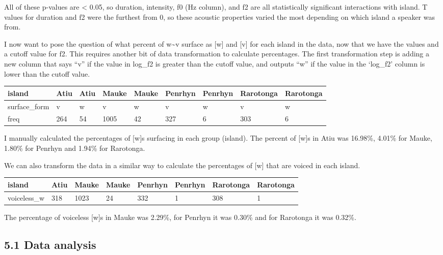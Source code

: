 \documentclass[
  ,man,floatsintext]{apa6}
\begin{document}
All of these p-values are \textless{} 0.05, so duration, intensity, f0 (Hz column), and f2 are all statistically significant interactions with island. T values for duration and f2 were the furthest from 0, so these acoustic properties varied the most depending on which island a speaker was from.

I now want to pose the question of what percent of w\textasciitilde v surface as {[}w{]} and {[}v{]} for each island in the data, now that we have the values and a cutoff value for f2. This requires another bit of data transformation to calculate percentages. The first transformation step is adding a new column that says ``v'' if the value in log\_f2 is greater than the cutoff value, and outputs ``w'' if the value in the `log\_f2' column is lower than the cutoff value.

\begin{tabular}{l|l|l|l|l|l|l|l|l}
\hline
island & Atiu & Atiu & Mauke & Mauke & Penrhyn & Penrhyn & Rarotonga & Rarotonga\\
\hline
surface\_form & v & w & v & w & v & w & v & w\\
\hline
freq & 264 & 54 & 1005 & 42 & 327 & 6 & 303 & 6\\
\hline
\end{tabular}

I manually calculated the percentages of {[}w{]}s surfacing in each group (island). The percent of {[}w{]}s in Atiu was 16.98\%, 4.01\% for Mauke, 1.80\% for Penrhyn and 1.94\% for Rarotonga.

We can also transform the data in a similar way to calculate the percentages of {[}w{]} that are voiced in each island.

\begin{tabular}{l|l|l|l|l|l|l|l}
\hline
island & Atiu & Mauke & Mauke & Penrhyn & Penrhyn & Rarotonga & Rarotonga\\
\hline
voiceless\_w & 318 & 1023 & 24 & 332 & 1 & 308 & 1\\
\hline
\end{tabular}

The percentage of voiceless {[}w{]}s in Mauke was 2.29\%, for Penrhyn it was 0.30\% and for Rarotonga it was 0.32\%.

\subsection{5.1 Data analysis}\label{data-analysis}
\end{document}
